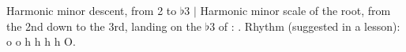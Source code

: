 \begin{patternbox}{Harmonic minor descent, from 2 to $\flat$3}{  $|$ }
Harmonic minor scale of the root, from the 2nd down to the 3rd, landing on the
$\flat$3 of : .
Rhythm (suggested in a lesson): o o h h h h O.
\patternwhereline
\end{patternbox}
